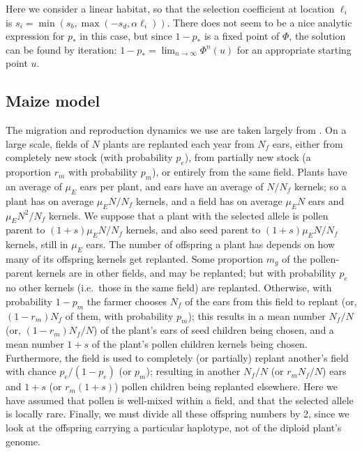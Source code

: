 Here we consider a linear habitat, so that the selection coefficient at location $\ell_i$ is $s_i = \min( s_b, \max( - s_d, \alpha \ell_i ) )$.
There does not seem to be a nice analytic expression for $p_*$ in this case,
but since $1-p_*$ is a fixed point of $\Phi$, the solution can be found by iteration:
$1-p_* = \lim_{n \to \infty} \Phi^n(u)$ for an appropriate starting point $u$.

\subsection{Maize model}

The migration and reproduction dynamics we use are taken largely from \citet{vanHeerwaarden2010}.  
On a large scale,
fields of $N$ plants are replanted each year from $N_f$ ears,
either from completely new stock (with probability $p_e$),
from partially new stock (a proportion $r_m$ with probability $p_m$),
or entirely from the same field.
Plants have an average of $\mu_E$ ears per plant, and ears have an average of $N/N_f$ kernels; 
so a plant has on average $\mu_E N/N_f$ kernels, and a field has on average $\mu_E N$ ears and $\mu_E N^2/N_f$ kernels.
We suppose that a plant with the selected allele is pollen parent to $(1+s) \mu_E N/N_f$ kernels,
and also seed parent to $(1+s)\mu_E N/N_f$ kernels, still in $\mu_E$ ears.
The number of offspring a plant has depends on how many of its offspring kernels get replanted.
Some proportion $m_g$ of the pollen-parent kernels are in other fields, and may be replanted;
but with probability $p_e$ no other kernels (i.e.~those in the same field) are replanted.
Otherwise, with probability $1-p_m$ the farmer chooses $N_f$ of the ears from this field to replant
(or, $(1-r_m) N_f$ of them, with probability $p_m$);
this results in a mean number $N_f/N$ (or, $(1-r_m)N_f/N$) of the plant's ears of seed children being chosen,
and a mean number $1+s$ of the plant's pollen children kernels being chosen.
Furthermore, the field is used to completely (or partially) replant another's field with chance $p_e/(1-p_e)$ (or $p_m$);
resulting in another $N_f/N$ (or $r_m N_f/N$) ears and $1+s$ (or $r_m (1+s)$) pollen children being replanted elsewhere.
Here we have assumed that pollen is well-mixed within a field,
and that the selected allele is locally rare.
Finally, we must divide all these offspring numbers by 2,
since we look at the offspring carrying a particular haplotype, not of the diploid plant's genome.


